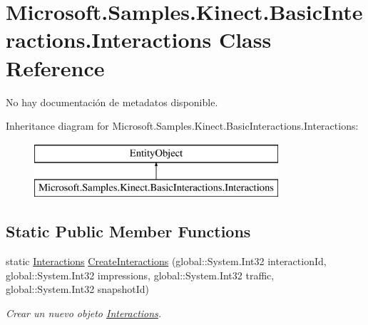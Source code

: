 \hypertarget{class_microsoft_1_1_samples_1_1_kinect_1_1_basic_interactions_1_1_interactions}{\section{Microsoft.\-Samples.\-Kinect.\-Basic\-Interactions.\-Interactions Class Reference}
\label{class_microsoft_1_1_samples_1_1_kinect_1_1_basic_interactions_1_1_interactions}
}


No hay documentación de metadatos disponible.  


Inheritance diagram for Microsoft.\-Samples.\-Kinect.\-Basic\-Interactions.\-Interactions\-:\begin{figure}[H]
\begin{center}
\leavevmode
\includegraphics[height=2.000000cm]{class_microsoft_1_1_samples_1_1_kinect_1_1_basic_interactions_1_1_interactions}
\end{center}
\end{figure}
\subsection*{Static Public Member Functions}
\begin{DoxyCompactItemize}
\item 
static \hyperlink{class_microsoft_1_1_samples_1_1_kinect_1_1_basic_interactions_1_1_interactions}{Interactions} \hyperlink{class_microsoft_1_1_samples_1_1_kinect_1_1_basic_interactions_1_1_interactions_a4e56dc94f84b4e474a26970599e02736}{Create\-Interactions} (global\-::\-System.\-Int32 interaction\-Id, global\-::\-System.\-Int32 impressions, global\-::\-System.\-Int32 traffic, global\-::\-System.\-Int32 snapshot\-Id)
\begin{DoxyCompactList}\small\item\em Crear un nuevo objeto \hyperlink{class_microsoft_1_1_samples_1_1_kinect_1_1_basic_interactions_1_1_interactions}{Interactions}. \end{DoxyCompactList}\end{DoxyCompactItemize}
